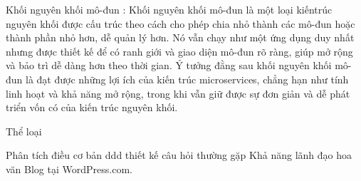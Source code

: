 Khối nguyên khối mô-đun : Khối nguyên khối mô-đun là một loại kiến ​​trúc nguyên khối được cấu trúc theo cách cho phép chia nhỏ thành các mô-đun hoặc thành phần nhỏ hơn, dễ quản lý hơn. Nó vẫn chạy như một ứng dụng duy nhất nhưng được thiết kế để có ranh giới và giao diện mô-đun rõ ràng, giúp mở rộng và bảo trì dễ dàng hơn theo thời gian. Ý tưởng đằng sau khối nguyên khối mô-đun là đạt được những lợi ích của kiến ​​trúc microservices, chẳng hạn như tính linh hoạt và khả năng mở rộng, trong khi vẫn giữ được sự đơn giản và dễ phát triển vốn có của kiến ​​trúc nguyên khối.

Thể loại

Phân tích
điều cơ bản
ddd
thiết kế
câu hỏi thường gặp
Khả năng lãnh đạo
hoa văn
Blog tại WordPress.com.